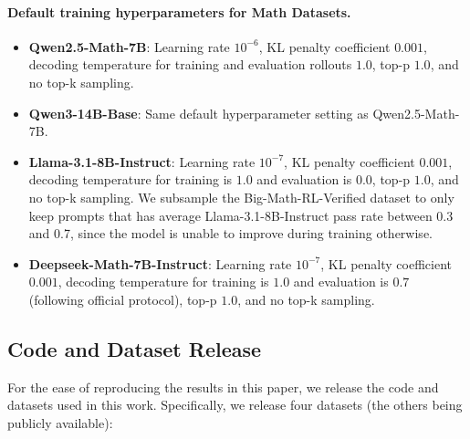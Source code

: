 \paragraph{Default training hyperparameters for Math Datasets.} 

\begin{itemize}
    \item \textbf{Qwen2.5-Math-7B}: Learning rate $10^{-6}$, KL penalty coefficient $0.001$, decoding temperature for training and evaluation rollouts $1.0$, top-p $1.0$, and no top-k sampling.
    \item \textbf{Qwen3-14B-Base}: Same default hyperparameter setting as Qwen2.5-Math-7B.
    \item \textbf{Llama-3.1-8B-Instruct}: Learning rate $10^{-7}$, KL penalty coefficient $0.001$, decoding temperature for training is $1.0$ and evaluation is $0.0$, top-p $1.0$, and no top-k sampling. We subsample the Big-Math-RL-Verified dataset to only keep prompts that has average Llama-3.1-8B-Instruct pass rate between 0.3 and 0.7, since the model is unable to improve during training otherwise.
    \item \textbf{Deepseek-Math-7B-Instruct}: Learning rate $10^{-7}$, KL penalty coefficient $0.001$, decoding temperature for training is $1.0$ and evaluation is $0.7$ (following official protocol), top-p $1.0$, and no top-k sampling. 
\end{itemize}

\subsection{Code and Dataset Release}

For the ease of reproducing the results in this paper, we release the code and datasets used in this work. Specifically, we release four datasets (the others being publicly available):

